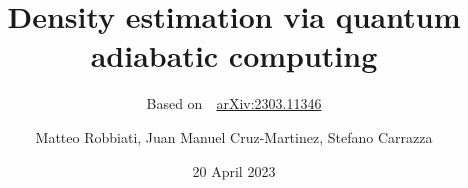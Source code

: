 \documentclass[8pt, xcolor={svgnames}, hyperref={colorlinks, linkcolor=black, citecolor=amethyst, urlcolor=amethyst}]{beamer}
\title{Density estimation via quantum adiabatic computing}
\subtitle{Based on \faBook\,\, \href{https://arxiv.org/abs/2303.11346}{arXiv:2303.11346}}
\date{20 April 2023}
\author[Matteo Robbiati, Juan Manuel Cruz-Martinez, Stefano Carrazza]{Matteo Robbiati, Juan Manuel Cruz-Martinez, Stefano Carrazza}
\begin{document}
\maketitle

\end{document}
